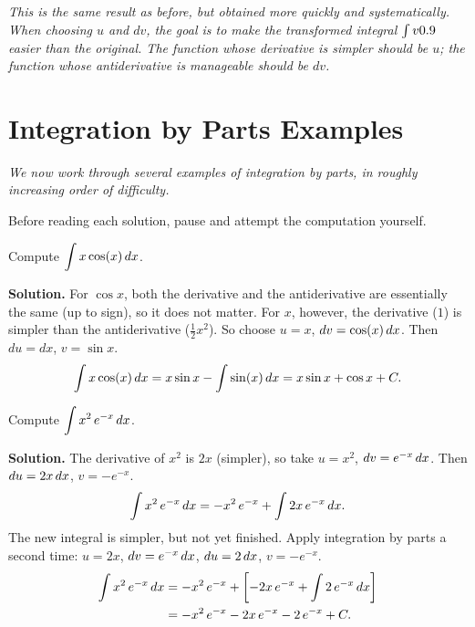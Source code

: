 \textit{This is the same result as before, but obtained more quickly and systematically.  When choosing $u$ and $dv$, the goal is to make the transformed integral $\int v0.9$ easier than the original.  The function whose derivative is simpler should be $u$; the function whose antiderivative is manageable should be $dv$.}

\section{Integration by Parts Examples}
\label{sec:9.5}

\textit{We now work through several examples of integration by parts, in roughly increasing order of difficulty.}

\begin{remark}
Before reading each solution, pause and attempt the computation yourself.
\end{remark}

\begin{example}
\label{ex:9-9}
Compute $\displaystyle\int x\cos(x)\,dx$.

\textbf{Solution.}  For $\cos x$, both the derivative and the antiderivative are essentially the same (up to sign), so it does not matter.  For $x$, however, the derivative ($1$) is simpler than the antiderivative ($\frac{1}{2}x^{2}$).  So choose $u = x$, $dv = \cos(x)\,dx$.  Then $du = dx$, $v = \sin x$.
\[
  \int x\cos(x)\,dx = x\sin x - \int \sin(x)\,dx = x\sin x + \cos x + C.
\]
\end{example}

\begin{example}
\label{ex:9-10}
Compute $\displaystyle\int x^{2}\,e^{-x}\,dx$.

\textbf{Solution.}  The derivative of $x^{2}$ is $2x$ (simpler), so take $u = x^{2}$, $dv = e^{-x}\,dx$.  Then $du = 2x\,dx$, $v = -e^{-x}$.
\[
  \int x^{2}\,e^{-x}\,dx = -x^{2}\,e^{-x} + \int 2x\,e^{-x}\,dx.
\]
The new integral is simpler, but not yet finished.  Apply integration by parts a second time: $u = 2x$, $dv = e^{-x}\,dx$, $du = 2\,dx$, $v = -e^{-x}$.
\begin{align*}
  \int x^{2}\,e^{-x}\,dx &= -x^{2}\,e^{-x} + \left[-2x\,e^{-x} + \int 2\,e^{-x}\,dx\right] \\
  &= -x^{2}\,e^{-x} - 2x\,e^{-x} - 2\,e^{-x} + C.
\end{align*}
\end{example}

